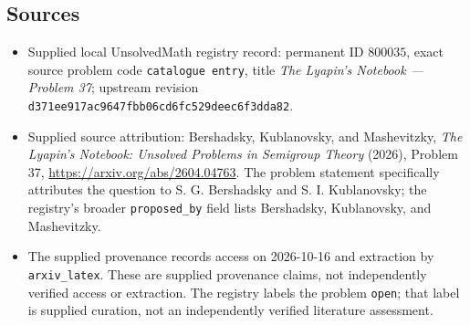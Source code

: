 \documentclass[11pt]{article}
\begin{document}
\subsection{Sources}
\begin{itemize}
\item Supplied local UnsolvedMath registry record: permanent ID \(800035\), exact source problem code \texttt{catalogue entry}, title \emph{The Lyapin's Notebook --- Problem 37}; upstream revision \texttt{d371ee917ac9647fbb06cd6fc529deec6f3dda82}.
\item Supplied source attribution: Bershadsky, Kublanovsky, and Mashevitzky, \emph{The Lyapin's Notebook: Unsolved Problems in Semigroup Theory} (2026), Problem 37, \url{https://arxiv.org/abs/2604.04763}. The problem statement specifically attributes the question to S. G. Bershadsky and S. I. Kublanovsky; the registry's broader \texttt{proposed\_by} field lists Bershadsky, Kublanovsky, and Mashevitzky.
\item The supplied provenance records access on 2026-10-16 and extraction by \texttt{arxiv\_latex}. These are supplied provenance claims, not independently verified access or extraction. The registry labels the problem \texttt{open}; that label is supplied curation, not an independently verified literature assessment.
\end{itemize}
\end{document}
